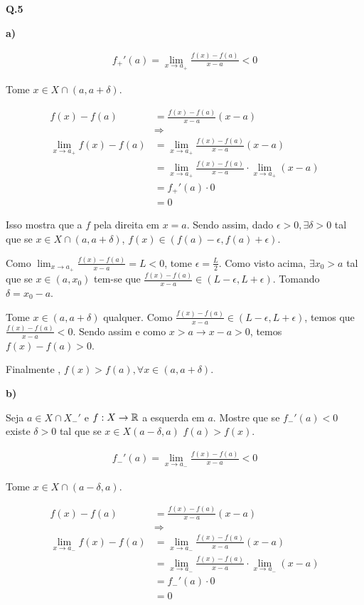 \textbf{Q.5}

\textbf{a)}

\begin{align*}
	f_+'(a) = \lim_{x\rightarrow a_+} \frac{f(x)-f(a)}{x-a} < 0
\end{align*}

Tome $x\in X\cap(a,a+\delta)$.

\begin{align*}
	f(x) - f(a) &= \frac{f(x)-f(a)}{x-a}(x-a) \\
	&\Longrightarrow \\
	\lim_{x\rightarrow a_+} f(x)-f(a) &= \lim_{x\rightarrow a_+} \frac{f(x)-f(a)}{x-a}(x-a) \\
	&= \lim_{x\rightarrow a_+} \frac{f(x)-f(a)}{x-a} \cdot \lim_{x\rightarrow a_+}(x-a) \\
	&= f_+'(a) \cdot 0\\
	&= 0
\end{align*}

Isso mostra que a \funcao $f$ \eh \continua pela direita em $x=a$. Sendo assim, dado $\epsilon >0, \exists \delta > 0$ tal que se $x\in X \cap (a, a+ \delta)$, \entao $f(x) \in (f(a) - \epsilon, f(a) + \epsilon)$. 

Como $\lim_{x\rightarrow a_+} \frac{f(x)-f(a)}{x-a} = L < 0$, tome $\epsilon = \frac{L}{2}$. Como visto acima, $\exists x_0 > a$ tal que se $x \in (a, x_0)$ tem-se que $\frac{f(x)-f(a)}{x-a} \in (L -\epsilon, L + \epsilon)$. Tomando $\delta = x_0 - a$.

Tome $x \in (a, a + \delta)$ qualquer. Como $\frac{f(x)-f(a)}{x-a} \in (L -\epsilon, L + \epsilon)$, temos que  $\frac{f(x)-f(a)}{x-a} < 0$. Sendo assim e como $x > a \rightarrow x-a>0$, temos $f(x) - f(a) > 0$. 

Finalmente \entao, $f(x) > f(a), \forall x \in (a, a + \delta)$.

\textbf{b)}

Seja $a\in X\cap X_-'$ e $f:X\rightarrow\mathbb{R}$ \derivavel a esquerda em $a$. Mostre que se $f_-'(a) < 0$ \entao existe $\delta > 0$ tal que se $x \in X (a-\delta, a)$ \entao $f(a) > f(x)$.

\begin{align*}
	f_-'(a) = \lim_{x\rightarrow a_-} \frac{f(x)-f(a)}{x-a} < 0
\end{align*}

Tome $x\in X\cap(a - \delta,a)$.

\begin{align*}
	f(x) - f(a) &= \frac{f(x)-f(a)}{x-a}(x-a) \\
	&\Longrightarrow \\
	\lim_{x\rightarrow a_-} f(x)-f(a) &= \lim_{x\rightarrow a_-} \frac{f(x)-f(a)}{x-a}(x-a) \\
	&= \lim_{x\rightarrow a_-} \frac{f(x)-f(a)}{x-a} \cdot \lim_{x\rightarrow a_-}(x-a) \\
	&= f_-'(a) \cdot 0\\
	&= 0
\end{align*}

